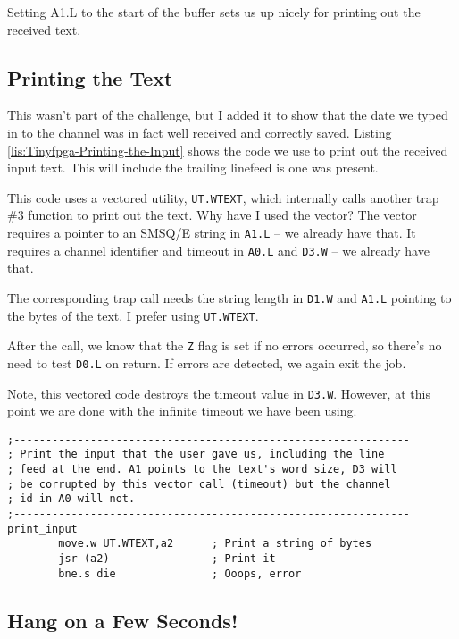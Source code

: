 Setting A1.L to the start of the buffer sets us up nicely for printing
out the received text.

\subsection{Printing the Text}

This wasn't part of the challenge, but I added it to show that the
date we typed in to the channel was in fact well received and correctly
saved. Listing \ref{lis:Tinyfpga-Printing-the-Input} shows the code
we use to print out the received input text. This will include the
trailing linefeed is one was present.

This code uses a vectored utility, \texttt{UT.WTEXT}, which internally
calls another trap \#3 function to print out the text. Why have I
used the vector? The vector requires a pointer to an SMSQ/E string
in \texttt{A1.L} -- we already have that. It requires a channel identifier
and timeout in \texttt{A0.L} and \texttt{D3.W} -- we already have
that.

The corresponding trap call needs the string length in \texttt{D1.W}
and \texttt{A1.L} pointing to the bytes of the text. I prefer using
\texttt{UT.WTEXT}.

After the call, we know that the \texttt{Z} flag is set if no errors
occurred, so there's no need to test \texttt{D0.L} on return. If errors
are detected, we again exit the job.

Note, this vectored code destroys the timeout value in \texttt{D3.W}.
However, at this point we are done with the infinite timeout we have
been using.

\begin{lstlisting}[caption={Tinyfpga - Printing the Input},label={lis:Tinyfpga-Printing-the-Input}]
;--------------------------------------------------------------
; Print the input that the user gave us, including the line
; feed at the end. A1 points to the text's word size, D3 will
; be corrupted by this vector call (timeout) but the channel
; id in A0 will not.
;--------------------------------------------------------------
print_input
        move.w UT.WTEXT,a2      ; Print a string of bytes
        jsr (a2)                ; Print it
        bne.s die               ; Ooops, error

\end{lstlisting}


\subsection{Hang on a Few Seconds!}

